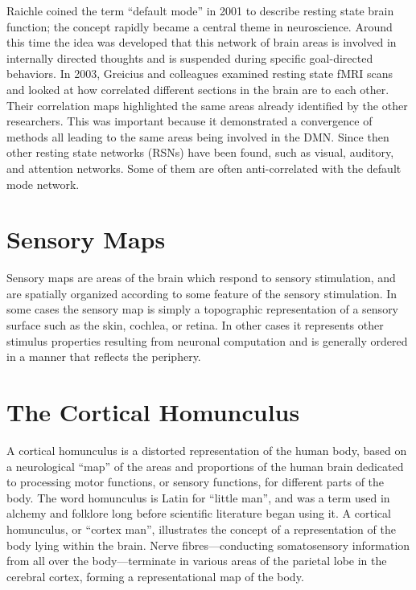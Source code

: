 Raichle coined the term ``default mode'' in 2001 to describe resting state brain function; the concept rapidly became a central theme in neuroscience. Around this time the idea was developed that this network of brain areas is involved in internally directed thoughts and is suspended during specific goal-directed behaviors. In 2003, Greicius and colleagues examined resting state fMRI scans and looked at how correlated different sections in the brain are to each other. Their correlation maps highlighted the same areas already identified by the other researchers. This was important because it demonstrated a convergence of methods all leading to the same areas being involved in the DMN. Since then other resting state networks (RSNs) have been found, such as visual, auditory, and attention networks. Some of them are often anti-correlated with the default mode network.

\hypertarget{sensory-maps}{%
\section{Sensory Maps}\label{sensory-maps}}

Sensory maps are areas of the brain which respond to sensory stimulation, and are spatially organized according to some feature of the sensory stimulation. In some cases the sensory map is simply a topographic representation of a sensory surface such as the skin, cochlea, or retina. In other cases it represents other stimulus properties resulting from neuronal computation and is generally ordered in a manner that reflects the periphery.

\hypertarget{the-cortical-homunculus}{%
\section{The Cortical Homunculus}\label{the-cortical-homunculus}}

A cortical homunculus is a distorted representation of the human body, based on a neurological ``map'' of the areas and proportions of the human brain dedicated to processing motor functions, or sensory functions, for different parts of the body. The word homunculus is Latin for ``little man'', and was a term used in alchemy and folklore long before scientific literature began using it. A cortical homunculus, or ``cortex man'', illustrates the concept of a representation of the body lying within the brain. Nerve fibres---conducting somatosensory information from all over the body---terminate in various areas of the parietal lobe in the cerebral cortex, forming a representational map of the body.

